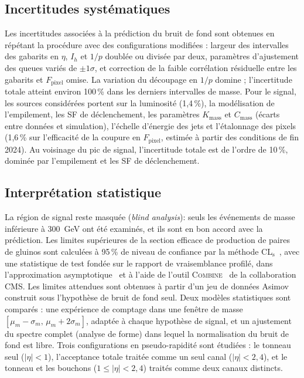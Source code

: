 \subsection{Incertitudes systématiques}

Les incertitudes associées à la prédiction du bruit de fond sont obtenues en répétant la procédure avec des configurations modifiées : largeur des intervalles des gabarits en $\eta$, $I_h$ et $1/p$ doublée ou divisée par deux, paramètres d'ajustement des queues variés de $\pm1\sigma$, et correction de la faible corrélation résiduelle entre les gabarits et $F_\mathrm{pixel}$ omise. La variation du découpage en $1/p$ domine ; l'incertitude totale atteint environ 100\,\% dans les derniers intervalles de masse. Pour le signal, les sources considérées portent sur la luminosité (1,4\,\%), la modélisation de l'empilement, les SF de déclenchement, les paramètres $K_\mathrm{mass}$ et $C_\mathrm{mass}$ (écarts entre données et simulation), l'échelle d'énergie des jets et l'étalonnage des pixels (1,6\,\% sur l'efficacité de la coupure en $F_\mathrm{pixel}$, estimée à partir des conditions de fin 2024). Au voisinage du pic de signal, l'incertitude totale est de l'ordre de 10\,\%, dominée par l'empilement et les SF de déclenchement.

\subsection{Interprétation statistique}

La région de signal reste masquée (\textit{blind analysis}): seuls les événements de masse inférieure à 300~GeV ont été examinés, et ils sont en bon accord avec la prédiction. Les limites supérieures de la section efficace de production de paires de gluinos sont calculées à 95\,\% de niveau de confiance par la méthode CL$_\mathrm{s}$~\cite{CLSpaper}, avec une statistique de test fondée sur le rapport de vraisemblance profilé, dans l'approximation asymptotique~\cite{AsymptoticPaper} et à l'aide de l'outil \textsc{Combine}~\cite{CombinePaper} de la collaboration CMS. Les limites attendues sont obtenues à partir d'un jeu de données Asimov construit sous l'hypothèse de bruit de fond seul. Deux modèles statistiques sont comparés : une expérience de comptage dans une fenêtre de masse $[\mu_m-\sigma_m,\,\mu_m+2\sigma_m]$, adaptée à chaque hypothèse de signal, et un ajustement du spectre complet (analyse de forme) dans lequel la normalisation du bruit de fond est libre. Trois configurations en pseudo-rapidité sont étudiées : le tonneau seul ($|\eta|<1$), l'acceptance totale traitée comme un seul canal ($|\eta|<2{,}4$), et le tonneau et les bouchons ($1\leq|\eta|<2{,}4$) traités comme deux canaux distincts.

